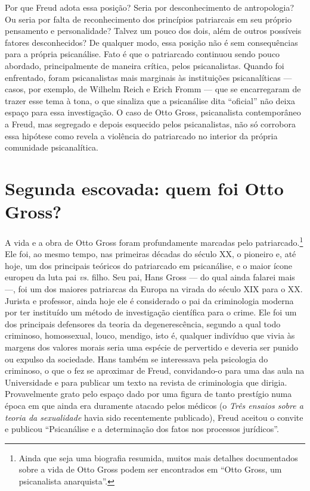 Por que Freud adota essa posição? Seria por desconhecimento de
antropologia? Ou seria por falta de reconhecimento dos princípios
patriarcais em seu próprio pensamento e personalidade? Talvez um pouco
dos dois, além de outros possíveis fatores desconhecidos? De qualquer
modo, essa posição não é sem consequências para a própria psicanálise.
Fato é que o patriarcado continuou sendo pouco abordado, principalmente
de maneira crítica, pelos psicanalistas. Quando foi enfrentado, foram
psicanalistas mais marginais às instituições psicanalíticas --- casos,
por exemplo, de Wilhelm Reich e Erich Fromm --- que se encarregaram de
trazer esse tema à tona, o que sinaliza que a psicanálise dita
``oficial'' não deixa espaço para essa investigação. O caso de Otto
Gross, psicanalista contemporâneo a Freud, mas segregado e depois
esquecido pelos psicanalistas, não só corrobora essa hipótese como
revela a violência do patriarcado no interior da própria comunidade
psicanalítica.

\section{Segunda escovada: quem foi Otto Gross? }

A vida e a obra de Otto Gross foram profundamente marcadas pelo
patriarcado.\footnote{Ainda que seja uma biografia resumida, muitos mais
  detalhes documentados sobre a vida de Otto Gross podem ser encontrados
  em ``Otto Gross, um psicanalista anarquista''.} Ele foi, ao mesmo
tempo, nas primeiras décadas do século XX, o pioneiro e, até hoje, um
dos principais teóricos do patriarcado em psicanálise, e o maior ícone
europeu da luta pai \emph{vs.} filho. Seu pai, Hans Gross --- do qual
ainda falarei mais ---, foi um dos maiores patriarcas da Europa na virada
do século XIX para o XX. Jurista e professor, ainda hoje ele é
considerado o pai da criminologia moderna por ter instituído um método
de investigação científica para o crime. Ele foi um dos principais
defensores da teoria da degenerescência, segundo a qual todo criminoso,
homossexual, louco, mendigo, isto é, qualquer indivíduo que vivia às
margens dos valores morais seria uma espécie de pervertido e deveria ser
punido ou expulso da sociedade. Hans também se interessava pela
psicologia do criminoso, o que o fez se aproximar de Freud, convidando-o
para uma das aula na Universidade e para publicar um texto na revista de
criminologia que dirigia. Provavelmente grato pelo espaço dado por uma
figura de tanto prestígio numa época em que ainda era duramente atacado
pelos médicos (o \emph{Três ensaios sobre a teoria da sexualidade} havia
sido recentemente publicado), Freud aceitou o convite e publicou
``Psicanálise e a determinação dos fatos nos processos jurídicos''.

